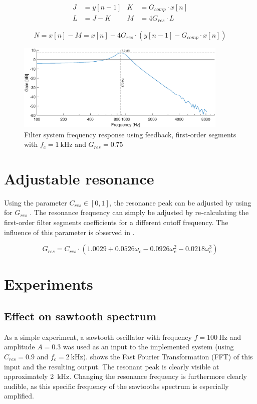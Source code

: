 \documentclass[a4paper, 12pt]{article}
\begin{document}
\begin{align}
	\label{eq:nodes5}
	J &= y[n-1] & K &= G_{comp} \cdot x[n] \\
	\label{eq:nodes6}
	L &= J - K & M &= 4 G_{res} \cdot L
\end{align}
	
\begin{equation}
	\label{eq:nodes7}
	N = x[n] - M = x[n] - 4 G_{res} \cdot (y[n-1] - G_{comp} \cdot x[n])
\end{equation}

\begin{figure}
	\centering
	\includegraphics[width=0.9\textwidth]{feedback-response.eps}
	\caption{Filter system frequency response using feedback, first-order segments with $f_c = \SI{1}{\kilo\hertz}$ and $G_{res}=0.75$}
	\label{fig:feedback-response}
\end{figure}

\section{Adjustable resonance}
Using the parameter $C_{res} \in [0, 1]$, the resonance peak can be adjusted by using  for $G_{res}$ \cite{Vaelimaeki2006}. The resonance frequency can simply be adjusted by re-calculating the first-order filter segments coefficients for a different cutoff frequency. The influence of this parameter is observed in .

\begin{equation}
	\label{eq:gres-polynom}
	G_{res} = C_{res} \cdot (1.0029 + 0.0526 \omega_c - 0.0926 \omega_c^2 - 0.0218 \omega_c^3)
\end{equation}

\section{Experiments}
\subsection{Effect on sawtooth spectrum}
As a simple experiment, a sawtooth oscillator with frequency $f=\SI{100}{\hertz}$ and amplitude $A=0.3$ was used as an input to the implemented system (using $C_{res}=0.9$ and $f_c = \SI{2}{\kilo\hertz}$).  shows the Fast Fourier Transformation (FFT) of this input and the resulting output. The resonant peak is clearly visible at approximately \SI{2}{\kilo\hertz}. Changing the resonance frequency is furthermore clearly audible, as this specific frequency of the sawtooths spectrum is especially amplified.
\end{document}
